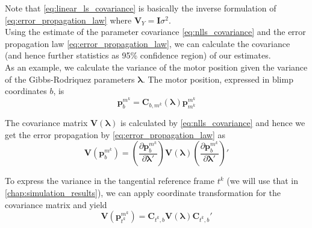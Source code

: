 Note that \cref{eq:linear_ls_covariance} is basically the inverse formulation of \cref{eq:error_propagation_law} where $\mathbf{V}_Y = \mathbf{I} \sigma^2$.
\\

Using the estimate of the parameter covariance \cref{eq:nlls_covariance} and the error propagation law \cref{eq:error_propagation_law}, we can calculate the covariance (and hence further statistics as 95\% confidence region) of our estimates.
\\

As an example, we calculate the variance of the motor position given the variance of the Gibbs-Rodriquez parameters $\boldsymbol{\lambda}$.
The motor position, expressed in blimp coordinates $b$, is
\begin{equation*}
\mathbf{p}^{m^k}_b = \mathbf{C}_{b,m^k}(\boldsymbol{\lambda}) \mathbf{p}^{m^k}_{m^k}
\end{equation*}

The covariance matrix $\mathbf{V}(\boldsymbol{\lambda})$ is calculated by \cref{eq:nlls_covariance} and hence we get the error propagation by \cref{eq:error_propagation_law} as
\begin{equation}
\mathbf{V} (\mathbf{p}^{m^k}_b) = 
\left(\frac{\partial \mathbf{p}^{m^k}_b}{\partial \boldsymbol{\lambda}'}\right)
\mathbf{V}(\boldsymbol{\lambda})
\left(\frac{\partial \mathbf{p}^{m^k}_b}{\partial \boldsymbol{\lambda}'}\right)'
\end{equation}

To express the variance in the tangential reference frame $t^k$ (we will use that in \cref{chap:simulation_results}), we can apply coordinate transformation for the covariance matrix and yield
\begin{equation}
\label{eq:variance_coordinates_tangential}
\mathbf{V} (\mathbf{p}^{m^k}_{t^k}) = 
\mathbf{C}_{t^k,b}
\mathbf{V}(\boldsymbol{\lambda})
\mathbf{C}_{t^k,b}'
\end{equation}
